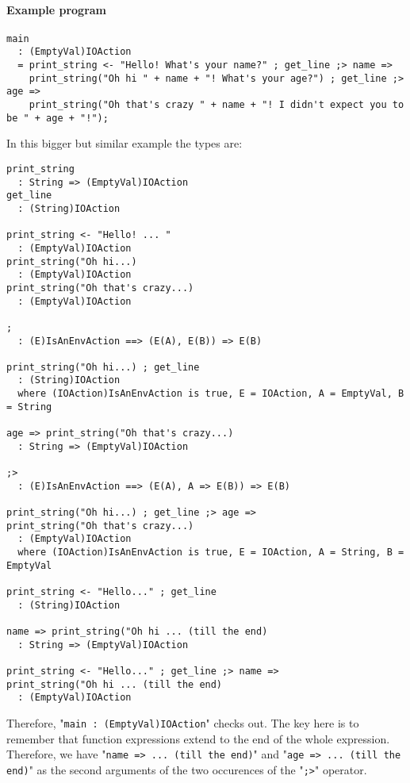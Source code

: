 \documentclass{article}
\begin{document}
\paragraph{Example program}
\begin{verbatim}
main
  : (EmptyVal)IOAction
  = print_string <- "Hello! What's your name?" ; get_line ;> name =>
    print_string("Oh hi " + name + "! What's your age?") ; get_line ;> age =>
    print_string("Oh that's crazy " + name + "! I didn't expect you to be " + age + "!");
\end{verbatim}
In this bigger but similar example the types are:
\begin{verbatim}
print_string
  : String => (EmptyVal)IOAction
get_line
  : (String)IOAction

print_string <- "Hello! ... "
  : (EmptyVal)IOAction
print_string("Oh hi...)
  : (EmptyVal)IOAction
print_string("Oh that's crazy...)
  : (EmptyVal)IOAction

;
  : (E)IsAnEnvAction ==> (E(A), E(B)) => E(B) 

print_string("Oh hi...) ; get_line
  : (String)IOAction
  where (IOAction)IsAnEnvAction is true, E = IOAction, A = EmptyVal, B = String

age => print_string("Oh that's crazy...)
  : String => (EmptyVal)IOAction

;>
  : (E)IsAnEnvAction ==> (E(A), A => E(B)) => E(B) 

print_string("Oh hi...) ; get_line ;> age =>
print_string("Oh that's crazy...)
  : (EmptyVal)IOAction
  where (IOAction)IsAnEnvAction is true, E = IOAction, A = String, B = EmptyVal

print_string <- "Hello..." ; get_line
  : (String)IOAction

name => print_string("Oh hi ... (till the end)
  : String => (EmptyVal)IOAction

print_string <- "Hello..." ; get_line ;> name =>
print_string("Oh hi ... (till the end)
  : (EmptyVal)IOAction
\end{verbatim}
Therefore, "\texttt{main\ :\ (EmptyVal)IOAction}" checks out.  The key here is
to remember that function expressions extend to the end of the whole
expression. Therefore, we have "\texttt{name => ... (till the end)}" and
"\texttt{age => ... (till the end)}" as the second arguments of the two
occurences of the "\texttt{;>}" operator. 
\end{document}
